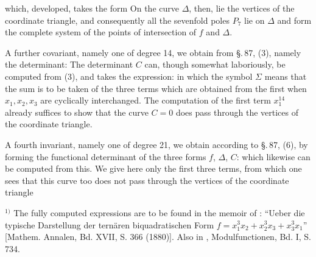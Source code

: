 which, developed, takes the form
On the curve $\Delta$, then, lie the vertices of the coordinate triangle,
and consequently all the sevenfold poles $P_7$ lie on $\Delta$ and
form the complete system of the points of intersection of $f$ and $\Delta$.

A further covariant, namely one of degree 14,
we obtain from \S.\,87, (3), namely the determinant:
The determinant $C$ can, though somewhat laboriously, be computed
from (3), and takes the expression:
in which the symbol $\Sigma$ means that the sum is to be taken of the
three terms which are obtained from the first when $x_1, x_2, x_3$
are cyclically interchanged. The computation of the first term
$x_1^{14}$ already suffices to show that the curve $C = 0$
does  pass through the vertices of the coordinate triangle.

A fourth invariant, namely one of degree 21,
we obtain according to \S.\,87, (6), by forming the functional determinant
of the three forms $f$, $\Delta$, $C$:
which likewise can be computed from this. We give here only the
first three terms, from which one sees that this curve too
does not pass through the vertices of the coordinate triangle

$^{1)}$ The fully computed expressions are to be found in the
memoir of : ``Ueber die typische Darstellung
der ternären biquadratischen Form $f = x_1^3x_2 + x_2^3x_3 + x_3^3x_1$''
[Mathem. Annalen, Bd. XVII, S. 366 (1880)]. Also in ,
Modulfunctionen, Bd. I, S. 734.
